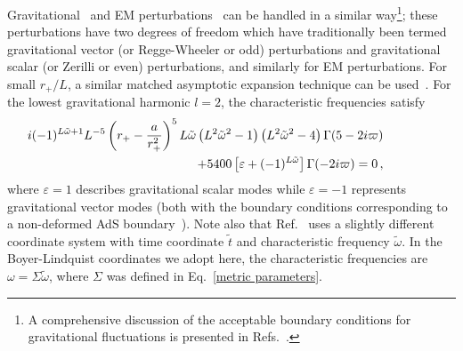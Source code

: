 \documentclass[11pt]{article}
\numberwithin{equation}{section} %
\begin{document}
%
Gravitational~\cite{Cardoso:2013pza} and EM perturbations~\cite{Wang:2015goa,Wang:2015fgp} can be handled in a similar 
way\footnote{A comprehensive discussion of the acceptable boundary conditions for gravitational fluctuations is 
presented in Refs.~\cite{Dias:2013sdc,Cardoso:2013pza,Sullivan:2017agx}.};
these perturbations have two degrees of freedom which have traditionally been termed gravitational vector (or 
Regge-Wheeler or odd) perturbations and gravitational scalar (or Zerilli or even) perturbations, and similarly for EM 
perturbations.
%
For small $r_+/L$, a similar matched asymptotic expansion technique can be used~\cite{Cardoso:2013pza}. For the lowest gravitational harmonic $l=2$, the characteristic frequencies satisfy 
%
\begin{eqnarray}\label{FreqMatchingl2}
&& \hspace{-3.2cm} 
i (-1)^{L \tilde{\omega} +1} L^{-5}\left(r_+-\frac{a}{r_+^2}\right)^5 L \tilde{\omega}  \left(L^2 \tilde{\omega} ^2-1\right)\left(L^2 \tilde{\omega} ^2-4\right) \Gamma (5-2 i \varpi ) \nonumber\\
&&   \hspace{3cm} +5400 \left[\varepsilon+(-1)^{L \tilde{\omega} }\right] \Gamma (-2 i \varpi )=0\,,
\end{eqnarray}
%
where $\varepsilon=1$ describes gravitational scalar modes while $\varepsilon=-1$ represents gravitational vector modes (both with the boundary conditions corresponding to a non-deformed AdS boundary~\cite{Cardoso:2013pza}).
Note also that Ref.~\cite{Cardoso:2013pza} uses a slightly different coordinate system with time coordinate $\tilde{t}$
and characteristic frequency $\tilde{\omega}$. In the Boyer-Lindquist coordinates we adopt here, the characteristic frequencies are $\omega=\Sigma\tilde{\omega}$, where $\Sigma$ was defined in Eq.~\eqref{metric parameters}.
\end{document}

